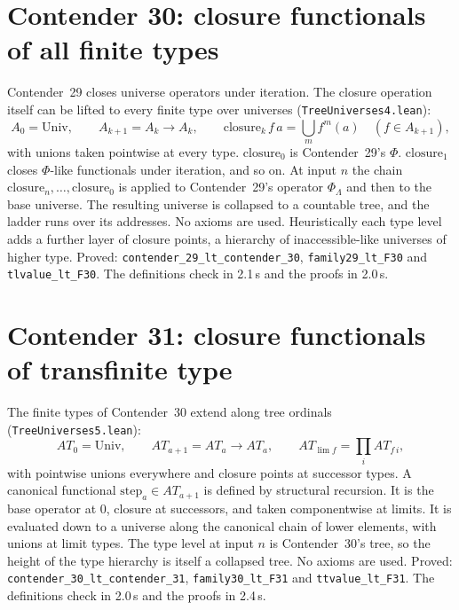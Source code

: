 \documentclass[11pt]{article}
\theoremstyle{definition}
\theoremstyle{remark}
\newcommand{\lean}[1]{\texttt{#1}}
\begin{document}
\section{Contender 30: closure functionals of all finite types}

Contender~29 closes universe operators under iteration. The closure operation
itself can be lifted to every finite type over universes
(\lean{TreeUniverses4.lean}):
\[
A_0=\mathrm{Univ},\qquad A_{k+1}=A_k\to A_k,\qquad
\mathrm{closure}_k\,f\,a=\textstyle\bigcup_m f^m(a)\quad(f\in A_{k+1}),
\]
with unions taken pointwise at every type. $\mathrm{closure}_0$ is Contender~29's
$\Phi$. $\mathrm{closure}_1$ closes $\Phi$-like functionals under iteration, and
so on. At input $n$ the chain $\mathrm{closure}_n,\dots,\mathrm{closure}_0$ is
applied to Contender~29's operator $\Phi_\Lambda$ and then to the base universe.
The resulting universe is collapsed to a countable tree, and the ladder runs over
its addresses. No axioms are used. Heuristically each type level adds a further
layer of closure points, a hierarchy of inaccessible-like universes of higher
type. Proved: \lean{contender\_29\_lt\_\allowbreak contender\_30},
\lean{family29\_lt\_F30} and \lean{tlvalue\_lt\_F30}. The definitions check in
2.1\,s and the proofs in 2.0\,s.

\section{Contender 31: closure functionals of transfinite type}

The finite types of Contender~30 extend along tree ordinals
(\lean{TreeUniverses5.lean}):
\[
AT_0=\mathrm{Univ},\qquad AT_{a+1}=AT_a\to AT_a,\qquad AT_{\lim f}=\textstyle\prod_i AT_{f\,i},
\]
with pointwise unions everywhere and closure points at successor types. A
canonical functional $\mathrm{step}_a\in AT_{a+1}$ is defined by structural
recursion. It is the base operator at $0$, closure at successors, and taken
componentwise at limits. It is evaluated down to a universe along the canonical
chain of lower elements, with unions at limit types. The type level at input
$n$ is Contender~30's tree, so the height of the type hierarchy is itself a
collapsed tree. No axioms are used. Proved:
\lean{contender\_30\_lt\_\allowbreak contender\_31}, \lean{family30\_lt\_F31} and
\lean{ttvalue\_lt\_F31}. The definitions check in 2.0\,s and the proofs in 2.4\,s.
\end{document}
